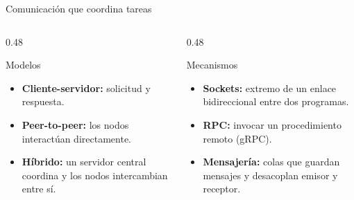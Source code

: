 \renewcommand{\fuentespie}{Fuentes: \cite{hbSimoes2026,hbSaleh2025,hbBep3,hbOracleSockets}}
\begin{frame}{Comunicación que coordina tareas}
  \begin{columns}[T,onlytextwidth]
    \begin{column}{0.48\textwidth}
      \begin{block}{Modelos}
        \small
        \begin{itemize}
          \item \textbf{Cliente-servidor:} solicitud y respuesta.~\cite{hbSimoes2026}
          \item \textbf{Peer-to-peer:} los nodos interactúan directamente.~\cite{hbSaleh2025}
          \item \textbf{Híbrido:} un servidor central coordina y los nodos intercambian entre sí.~\cite{hbBep3}
        \end{itemize}
      \end{block}
    \end{column}
    \begin{column}{0.48\textwidth}
      \begin{block}{Mecanismos}
        \small
        \begin{itemize}
          \item \textbf{Sockets:} extremo de un enlace bidireccional entre dos programas.~\cite{hbOracleSockets}
          \item \textbf{RPC:} invocar un procedimiento remoto (gRPC).~\cite{hbSimoes2026}
          \item \textbf{Mensajería:} colas que guardan mensajes y desacoplan emisor y receptor.~\cite{hbSaleh2025}
        \end{itemize}
      \end{block}
    \end{column}
  \end{columns}
\end{frame}
\renewcommand{\fuentespie}{Fuentes: [PENDIENTE]}

